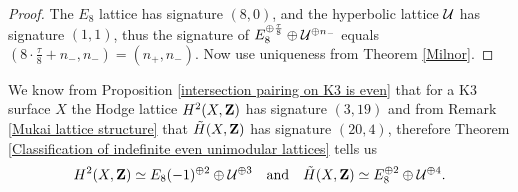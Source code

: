 \begin{proof}
    The $E_8$ lattice has signature $(8,0)$, and the hyperbolic lattice $\mathcal U$ has signature $(1,1)$, thus the signature of $E_8^{\oplus \frac{\tau}{8}} \oplus \mathcal U^{\oplus n_-}$ equals $(8\cdot \tfrac{\tau}{8} + n_-,n_-) = (n_+, n_-)$. Now use uniqueness from Theorem \ref{Milnor}.
\end{proof}

\begin{remark}
    We know from Proposition \ref{intersection pairing on K3 is even} that for a K3 surface $X$ the Hodge lattice $H^{2}(X, \mathbf Z)$ has signature $(3,19)$ and from Remark \ref{Mukai lattice structure} that $\,\tilde{\!{H}}(X, \mathbf Z)$ has signature $(20,4)$, therefore Theorem \ref{Classification of indefinite even unimodular lattices} tells us
    \[
        H^{2}(X, \mathbf Z) \simeq E_8(-1)^{\oplus 2} \oplus \mathcal U^{\oplus 3} \quad \text{and} \quad
        \,\tilde{\!{H}}(X, \mathbf Z) \simeq E_8^{\oplus 2} \oplus \mathcal U^{\oplus 4}.
    \]
\end{remark}
